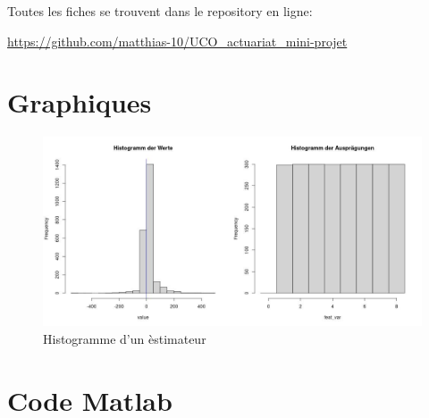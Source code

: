 \documentclass[a4paper,12pt]{scrartcl}
\begin{document}
\begin{center}
Toutes les fiches se trouvent dans le repository en ligne: 

 \url{https://github.com/matthias-10/UCO_actuariat_mini-projet}
\end{center}

\section{Graphiques}

\begin{figure}[h!]
  \begin{center}
    \includegraphics[width=14cm]{"graphiques/hist_feat_value.jpg"}
    \caption{Histogramme d'un èstimateur}
    \label{hist_C_inf}
  \end{center}
\end{figure}


\section{Code Matlab}

\end{document}
